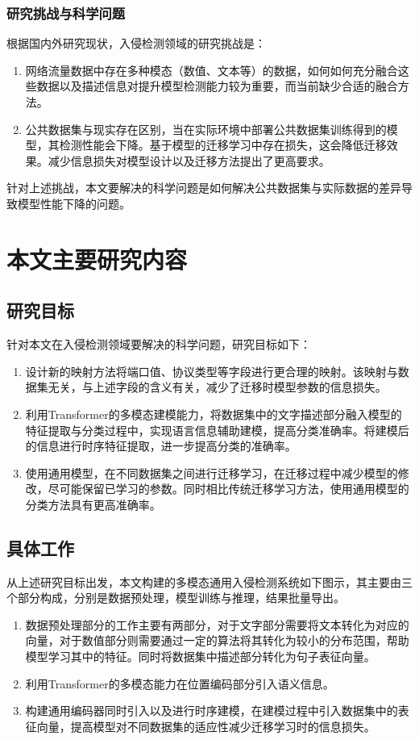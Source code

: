 \subsubsection{研究挑战与科学问题}
根据国内外研究现状，入侵检测领域的研究挑战是：
\begin{enumerate}
    \item 网络流量数据中存在多种模态（数值、文本等）的数据，如何如何充分融合这些数据以及描述信息对提升模型检测能力较为重要，而当前缺少合适的融合方法。
    \item 公共数据集与现实存在区别，当在实际环境中部署公共数据集训练得到的模型，其检测性能会下降。基于模型的迁移学习中存在损失，这会降低迁移效果。减少信息损失对模型设计以及迁移方法提出了更高要求。
\end{enumerate}

针对上述挑战，本文要解决的科学问题是如何解决公共数据集与实际数据的差异导致模型性能下降的问题。

\section{本文主要研究内容}
\label{sec:Research content for this paper}
\subsection{研究目标}
针对本文在入侵检测领域要解决的科学问题，研究目标如下：
\begin{enumerate}
    \item 设计新的映射方法将端口值、协议类型等字段进行更合理的映射。该映射与数据集无关，与上述字段的含义有关，减少了迁移时模型参数的信息损失。
    \item 利用Transformer的多模态建模能力，将数据集中的文字描述部分融入模型的特征提取与分类过程中，实现语言信息辅助建模，提高分类准确率。将建模后的信息进行时序特征提取，进一步提高分类的准确率。
    \item 使用通用模型，在不同数据集之间进行迁移学习，在迁移过程中减少模型的修改，尽可能保留已学习的参数。同时相比传统迁移学习方法，使用通用模型的分类方法具有更高准确率。
\end{enumerate}

\subsection{具体工作}

从上述研究目标出发，本文构建的多模态通用入侵检测系统如下图示，其主要由三个部分构成，分别是数据预处理，模型训练与推理，结果批量导出。
\begin{enumerate}
    \item 数据预处理部分的工作主要有两部分，对于文字部分需要将文本转化为对应的向量，对于数值部分则需要通过一定的算法将其转化为较小的分布范围，帮助模型学习其中的特征。同时将数据集中描述部分转化为句子表征向量。
    \item 利用Transformer的多模态能力在位置编码部分引入语义信息。
    \item 构建通用编码器同时引入以及进行时序建模，在建模过程中引入数据集中的表征向量，提高模型对不同数据集的适应性减少迁移学习时的信息损失。

\end{enumerate}

